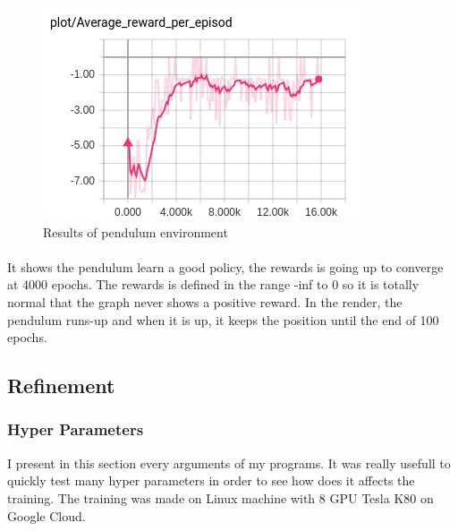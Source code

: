 \documentclass{article}
\begin{document}
\begin{figure}[ht]
  \centering
  \includegraphics[width=.5\textwidth]{avg_per_episode_pendulum}
  \caption{Results of pendulum environment}
  \label{fig:result_pendulum}
\end{figure}

\paragraph{}
It shows the pendulum learn a good policy, the rewards is going up to converge
at 4000 epochs. The rewards is defined in the range -inf to 0 so it is totally
normal that the graph never shows a positive reward. In the render, the pendulum
runs-up and when it is up, it keeps the position until the end of 100 epochs.

\subsection{Refinement}

\subsubsection{Hyper Parameters}
\label{subsubsec:hp_params}

I present in this section every arguments of my programs. It was really usefull
to quickly test many hyper parameters in order to see how does it affects the
training. The training was made on Linux machine with 8 GPU Tesla K80 on Google
Cloud.
\end{document}
